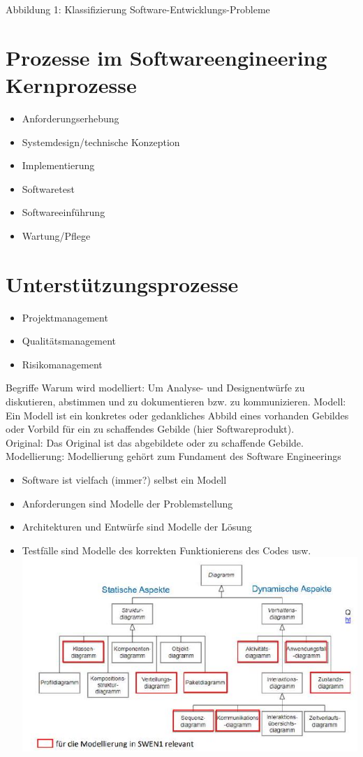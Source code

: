 Abbildung 1: Klassifizierung Software-Entwicklungs-Probleme

\section*{Prozesse im Softwareengineering Kernprozesse}
\begin{itemize}
  \item Anforderungserhebung
  \item Systemdesign/technische Konzeption
  \item Implementierung
  \item Softwaretest
  \item Softwareeinführung
  \item Wartung/Pflege
\end{itemize}

\section*{Unterstützungsprozesse}
\begin{itemize}
  \item Projektmanagement
  \item Qualitätsmanagement
  \item Risikomanagement
\end{itemize}

Begriffe Warum wird modelliert: Um Analyse- und Designentwürfe zu diskutieren, abstimmen und zu dokumentieren bzw. zu kommunizieren. Modell: Ein Modell ist ein konkretes oder gedankliches Abbild eines vorhanden Gebildes oder Vorbild für ein zu schaffendes Gebilde (hier Softwareprodukt).\\
Original: Das Original ist das abgebildete oder zu schaffende Gebilde.\\
Modellierung: Modellierung gehört zum Fundament des Software Engineerings

\begin{itemize}
  \item Software ist vielfach (immer?) selbst ein Modell
  \item Anforderungen sind Modelle der Problemstellung
  \item Architekturen und Entwürfe sind Modelle der Lösung
  \item Testfälle sind Modelle des korrekten Funktionierens des Codes usw.\\
\includegraphics[width=\linewidth]{images/2024_12_29_0d1d7b5551ea1b4b41bdg-01(1)}
\end{itemize}

